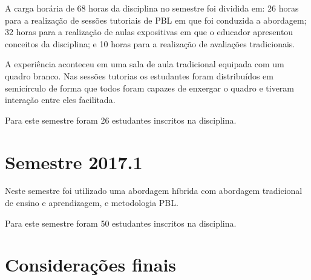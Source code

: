 A carga horária de 68 horas da disciplina no semestre foi dividida em:
26 horas para a realização de sessões tutoriais de PBL em que foi conduzida a abordagem;
32 horas para a realização de aulas expositivas em que o educador apresentou conceitos da disciplina;
e 10 horas para a realização de avaliações tradicionais.

A experiência aconteceu em uma sala de aula tradicional equipada com um
quadro branco.
Nas sessões tutorias os estudantes foram distribuídos em semicírculo de forma que todos foram capazes de
enxergar o quadro e tiveram interação entre eles facilitada.

Para este semestre foram 26 estudantes inscritos na disciplina.

\section{Semestre 2017.1}
Neste semestre foi utilizado uma abordagem híbrida com abordagem tradicional de ensino
e aprendizagem, e metodologia PBL.

Para este semestre foram 50 estudantes inscritos na disciplina.
\section{Considerações finais}
